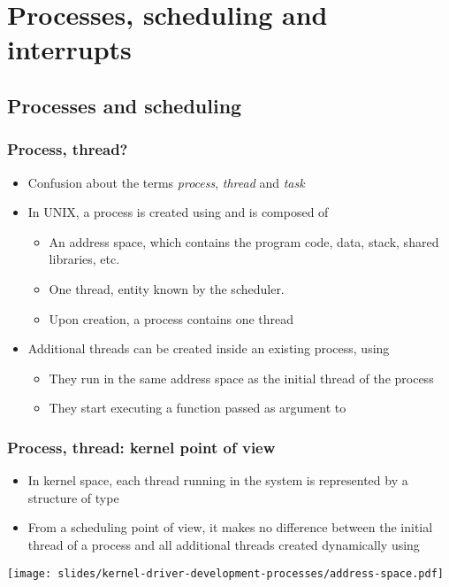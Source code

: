\section{Processes, scheduling and interrupts}

\subsection{Processes and scheduling}

\begin{frame}
  \frametitle{Process, thread?}
  \begin{itemize}
  \item Confusion about the terms \emph{process}, \emph{thread} and
    \emph{task}
  \item In UNIX, a process is created using  and is
    composed of
    \begin{itemize}
    \item An address space, which contains the program code, data,
      stack, shared libraries, etc.
    \item One thread, entity known by the scheduler.
    \item Upon creation, a process contains one thread
    \end{itemize}
  \item Additional threads can be created inside an existing process,
    using 
    \begin{itemize}
    \item They run in the same address space as the initial thread of
      the process
    \item They start executing a function passed as argument to
    \end{itemize}
  \end{itemize}
\end{frame}

\begin{frame}
  \frametitle{Process, thread: kernel point of view}
  \begin{itemize}
  \item In kernel space, each thread running in the system is
    represented by a structure of type 
  \item From a scheduling point of view, it makes no difference
    between the initial thread of a process and all additional threads
    created dynamically using 
  \end{itemize}
  \begin{center}
    \texttt{[image: slides/kernel-driver-development-processes/address-space.pdf]}
  \end{center}
\end{frame}

